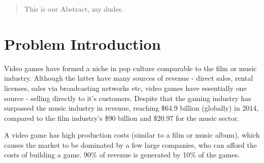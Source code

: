 \documentclass[12p]{article}
\begin{document}

\begin{abstract}
\thispagestyle{plain} %
  This is our Abstract, my dudes.

\end{abstract}

\newpage


\tableofcontents %
\thispagestyle{plain} %

\newpage %


\section{Problem Introduction} \label{ProblemIntroduction}

Video games have formed a niche in pop culture comparable to the film or music industry. Although the latter have many sources of revenue - direct sales, rental licenses, sales via broadcasting networks etc, video games have essentially one source - selling directly to it’s customers. Despite that the gaming industry has surpassed the music industry in revenue, reaching \$64.9 billion (globally) in 2014, compared to the film industry’s \$90 billion and \$20.97 for the music sector.\cite{UnderstandingVideoGames}

A video game has high production costs (similar to a film or music album), which causes the market to be dominated by a few large companies, who can afford the costs of building a game. 90\% of revenue is generated by 10\% of the games.\cite{UnderstandingVideoGames}
\end{document}
